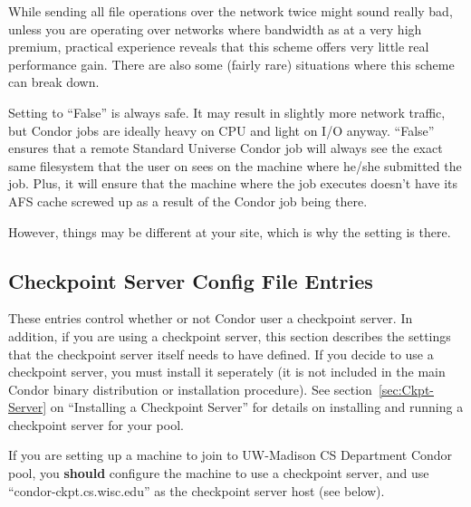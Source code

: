 \begin{description}
  While sending all file operations over the network twice might sound
  really bad, unless you are operating over networks where bandwidth
  as at a very high premium, practical experience reveals that this
  scheme offers very little real performance gain.  There are also
  some (fairly rare) situations where this scheme can break down.
  
  Setting  to ``False'' is always safe.  It may result
  in slightly more network traffic, but Condor jobs are ideally heavy
  on CPU and light on I/O anyway.  ``False'' ensures that a remote
  Standard Universe Condor job will always see the exact same
  filesystem that the user on sees on the machine where he/she
  submitted the job.  Plus, it will ensure that the machine where the
  job executes doesn't have its AFS cache screwed up as a result of
  the Condor job being there.  
  
  However, things may be different at your site, which is why the
  setting is there.

\end{description}

\subsection{\label{sec:Checkpoint-Server-Config-File-Entries}
Checkpoint Server Config File Entries}

These entries control whether or not Condor user a checkpoint server.
In addition, if you are using a checkpoint server, this section
describes the settings that the checkpoint server itself needs to have
defined.  If you decide to use a checkpoint server, you must install
it seperately (it is not included in the main Condor binary
distribution or installation procedure).  See
section~\ref{sec:Ckpt-Server} on ``Installing a Checkpoint Server''
for details on installing and running a checkpoint server for your
pool.

\Note If you are setting up a machine to join to UW-Madison CS
Department Condor pool, you \textbf{should} configure the machine to
use a checkpoint server, and use ``condor-ckpt.cs.wisc.edu'' as the
checkpoint server host (see below).

